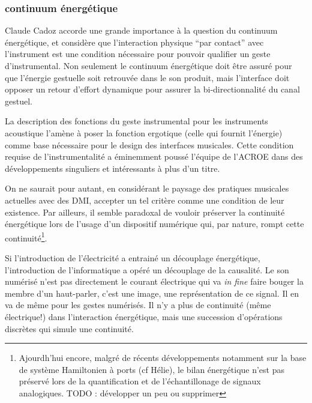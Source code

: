 \subsubsection{continuum énergétique}

Claude Cadoz accorde une grande importance à la question du continuum énergétique, et considère que l'interaction physique ``par contact'' avec l'instrument est une condition nécessaire pour pouvoir qualifier un geste d'instrumental. Non seulement le continuum énergétique doit être assuré pour que l'énergie gestuelle soit retrouvée dans le son produit, mais l'interface doit opposer un retour d'effort dynamique pour assurer la bi-directionnalité du canal gestuel.

\cite{cadoz_musique_1999}

La description des fonctions du geste instrumental pour les instruments acoustique l'amène à poser la fonction ergotique (celle qui fournit l'énergie) comme base nécessaire pour le design des interfaces musicales. Cette condition requise de l'instrumentalité a éminemment poussé l'équipe de l'\gls{ACROE} dans des développements singuliers et intéressants à plus d'un titre. 

On ne saurait pour autant, en considérant le paysage des pratiques musicales actuelles avec des DMI, accepter un tel critère comme une condition de leur existence. Par ailleurs, il semble paradoxal de vouloir préserver la continuité énergétique lors de l'usage d'un dispositif numérique qui, par nature, rompt cette continuité\footnote{Ajourdh'hui encore, malgré de récents développements notamment sur la base de système Hamiltonien à ports (cf Hélie), le bilan énergétique n'est pas préservé lors de la quantification et de l'échantillonage de signaux analogiques. TODO : développer un peu ou supprimer}. 



Si l'introduction de l'électricité a entrainé un découplage énergétique, l'introduction de l'informatique a opéré un découplage de la causalité. Le son numérisé n'est pas directement le courant électrique qui va \textit{in fine} faire bouger la membre d'un haut-parler, c'est une image, une représentation de ce signal. Il en va de même pour les gestes numérisés. Il n'y a plus de continuité (même électrique!) dans l'interaction énergétique, mais une succession d'opérations discrètes qui simule une continuité. 


